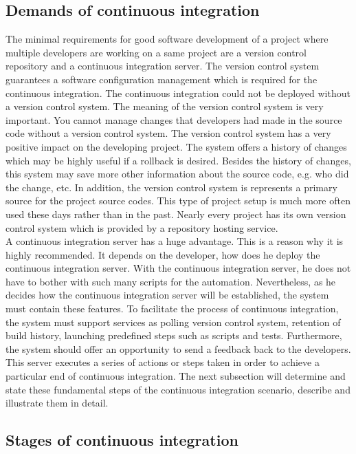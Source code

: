 \subsection{Demands of continuous integration}
The minimal requirements for good software development of a project where multiple developers are working on a same project are a version control repository and a continuous integration server. The version control system guarantees a software configuration management which is required for the continuous integration. The continuous integration could not be deployed without a version control system. The meaning of the version control system is very important. You cannot manage changes that developers had made in the source code without a version control system. The version control system has a very positive impact on the developing project. The system offers a history of changes which may be highly useful if a rollback is desired. Besides the history of changes, this system may save more other information about the source code, e.g. who did the change, etc. In addition, the version control system is represents a primary source for the project source codes. This type of project setup is much more often used these days rather than in the past. Nearly every project has its own version control system which is provided by a repository hosting service.\\

A continuous integration server has a huge advantage. This is a reason why it is highly recommended. It depends on the developer, how does he deploy the continuous integration server. With the continuous integration server, he does not have to bother with such many scripts for the automation. Nevertheless, as he decides how the continuous integration server will be established, the system must contain these features. To facilitate the process of continuous integration, the system must support services as polling version control system, retention of build history, launching predefined steps such as scripts and tests. Furthermore, the system should offer an opportunity to send a feedback back to the developers. This server executes a series of actions or steps taken in order to achieve a particular end of continuous integration. The next subsection will determine and state these fundamental steps of the continuous integration scenario, describe and illustrate them in detail.

\subsection{Stages of continuous integration}

